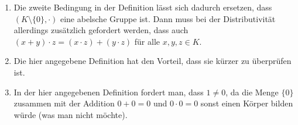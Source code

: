 \begin{bem}
 \begin{enumerate}[leftmargin=*]
  \item
   Die zweite Bedingung in der Definition lässt sich dadurch ersetzen, dass $(K\setminus\{0\},\cdot)$ eine abelsche Gruppe ist. Dann muss bei der Distributivität allerdings zusätzlich gefordert werden, dass auch $(x+y) \cdot z = (x \cdot z) + (y \cdot z)$ für alle $x,y,z \in K$.
  \item
   Die hier angegebene Definition hat den Vorteil, dass sie kürzer zu überprüfen ist.
  \item
   In der hier angegebenen Definition fordert man, dass $1 \neq 0$, da die Menge $\{0\}$ zusammen mit der Addition $0 + 0 = 0$ und $0 \cdot 0 = 0$ sonst einen Körper bilden würde (was man nicht möchte).
 \end{enumerate}
\end{bem}


